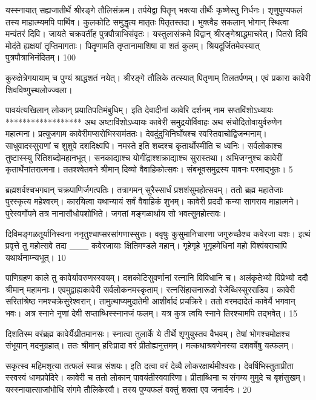 यस्स्नायात् सह्यजातीर्थे श्रीरङ्गे तौलिसंक्रम।
तर्पयेद्वा पितॄन् भक्त्या तीर्थैः कृष्णेस्तु निर्धनः।
शृणुपुण्यफलं तस्य माहात्म्यमपि पार्थिव।
कुलकोटि समुद्धृत्य मातृतः पितृतस्तदा।
भुक्त्वैह सकलान् भोगान् स्थित्वा मन्वंतरं दिवि।
जायते चक्रवर्तीह पुत्रपौत्राभिसंवृतः।
यस्तुलासंक्रमे विद्वान् श्रीरङ्गेश्राद्धमाचरेत्।
पितरो दिवि मोदंते ह्यक्षयां तृप्तिमागताः।
पितॄणामति तृप्तानामाशिषा वा शतं कुलम्।
श्रियदूर्जितमेवस्यात् पुत्रपौत्राभिनंदितम्।
100

कुरुक्षेत्रेगयायाम् च पुण्यं श्राद्धशतं नयेत्।
श्रीरङ्गे तौलिके तत्स्यात् पितृणाम् तिलतर्पणम्।
एवं प्रकारा कावेरी शिवविष्णुस्थलोज्ज्वला।

पावयंत्यखिलान् लोकान् प्रयातिपतिमंबुधिम्।
इति देवादीनां कावेरि दर्शनम् नाम सप्तविंशोऽध्यायः
******************
अथ अष्टाविंशोऽध्यायः
कावेरी समुद्रयोर्विवाहः अथ संचोदितोवायुर्वरुणेन महात्मना।
प्रत्युजगाम कावेरीमप्सरोभिस्समंततः।
देवदुंदुभिनिर्घोषश्च स्वस्तिवाचोद्विजन्मनाम्।
साधुवादस्सुराणां च शुशुवे दशदिक्ष्वपि।
नमस्ते इति शब्दश्च कृतार्थोस्मीति च ध्वनिः।
सर्वलोकाश्च तुष्टास्स्यु रितिशब्दोमहानभूत्।
सनकाद्याश्च योगींद्राश्शक्राद्याश्च सुरास्तथा।
अभिजग्नुश्च कावेरीं कृतार्थेनांतरात्मना।
ततश्श्वेतवने श्रीमान् दिव्यो वैवाहिकोत्सवः।
संबभूवसमुद्रस्य पावनः परमाद्भुतः।
5

ब्रह्मशर्वश्चभगवान् चक्रपाणिर्जगत्पतिः।
तत्रागमन् सुरैस्सार्धं प्रशशंसुमहोत्सवम्।
ततो ब्रह्म महातेजाः पुरस्कृत्य महेश्वरम्।
कारयित्वा यथान्यायं सर्वं वैवाहिकं शुभम्।
कावेरी प्रददौ कन्या सागराय माहात्मने।
पुरेस्वर्गोपमे तत्र नानासौधोपशोभिते।
जगतां मङ्गळार्थाय सो भवत्सुमहोत्सवः।

दिविमङ्गळतूर्यानिस्वना ननृतुश्चाप्सरसांगणास्सुराः।
ववृषुः कुसुमानिचारणा जगुरुच्छैश्च कवेरजा यशः।
इत्थं प्रवृत्ते तु महोत्सवे तदा
___ कवेरजायाः क्षितिमण्डले महान्।
गृहेगृहे भूगृहमेधिनां महो
विश्वंबराचापि यथार्थनाम्न्यभूत्।
10

पाणिग्रहण काले तु कावेर्यावरुणस्स्वयम्।
दशकोटिसुवर्णानां रत्नानि विविधानि च।
अलंकृतेभ्यो विप्रेभ्यो ददौ श्रीमान् महामनाः।
एवमुद्वाह्यकावेरी सर्वलोकनमस्कृताम्।
रत्नसिंहासनारूढो रेजेब्धिस्सुरराडिव।
कावेरी सरितांश्रेष्ठ नमश्चक्रेसुरेश्वरान्।
तामुत्थाप्यमुदातेमी आशीर्वादं प्रचक्रिरे।
ततो वरमदादेतं कावेर्यै भगवान् भवः।
अत्र स्नाने नृणां देवी सप्ताब्धिस्स्नानजं फलम्।
यत्र कुत्र त्वयि स्नाने तिरश्चामपि तद्भवेत्।
15

दिशतिस्म वरंब्रह्म कावेर्यैःप्रीतमानसः।
स्नात्वा तुलार्के ये तीर्थे शृणुयुस्तव वैभवम्।
तेषां भोगश्चमोक्षश्च संभूयान् मदनुग्रहात्।
ततः श्रीमान् हरिःप्रादा वरं प्रीतोह्यनुत्तमम्।
मत्कथाश्रवणेनस्या दशवर्षेषु यत्फलम्।

सकृत्स्व महिमशृत्या तत्फलं स्यान्न संशयः।
इति दत्वा वरं देव्यै लोकरक्षार्थमीश्वराः।
देवर्षिभिस्तुताप्रीता स्स्वस्वं धामप्रपेदिरे।
कावेरी च ततो लोकान् पावयंतीस्ववारिणा।
प्रीताब्धिना च संगम्य मुमुदे च बृशंसुखम्।
यस्स्नायात्साजांभोधि संगमे तौलिकेरवौ।
तस्य पुण्यफलं वक्तुं शक्ता एव जनार्दनः।
20

